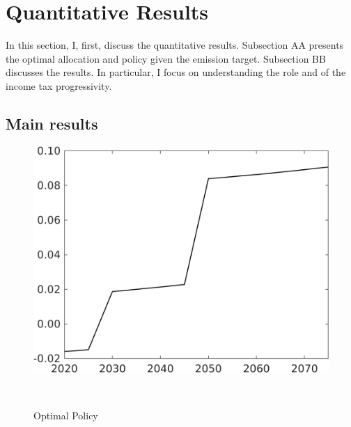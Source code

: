 \section{Quantitative Results}

In this section, I, first, discuss the quantitative results.
Subsection AA presents the optimal allocation and policy given the emission target. Subsection BB discusses the results. In particular, I focus on understanding the role and of the income tax progressivity. 

\subsection{Main results}
\begin{figure}[h!!]
	\centering
	\caption{Optimal Policy }\label{fig:optPol}
	\begin{minipage}[]{0.4\textwidth}
		\includegraphics[width=1\textwidth]{../../codding_model/own_basedOnFried/optimalPol_elastS_DisuSci/figures/all_1705/Single_OPT_T_NoTaus_taul_spillover0_sep1_BN0_ineq0_etaa0.79.png}
	\end{minipage}
\begin{minipage}[]{0.1\textwidth}
\
\end{minipage}
	\begin{minipage}[]{0.4\textwidth}

\end{minipage}
\end{figure}

